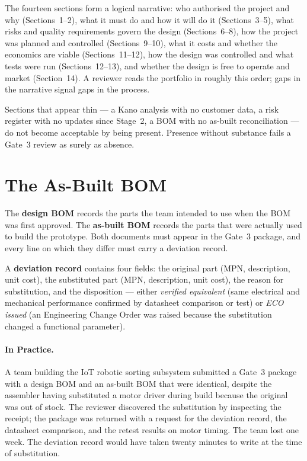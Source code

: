 The fourteen sections form a logical narrative: who authorised the project and
why (Sections~1--2), what it must do and how it will do it (Sections~3--5),
what risks and quality requirements govern the design (Sections~6--8), how the
project was planned and controlled (Sections~9--10), what it costs and whether
the economics are viable (Sections~11--12), how the design was controlled and
what tests were run (Sections~12--13), and whether the design is free to
operate and market (Section~14).
A reviewer reads the portfolio in roughly this order; gaps in the narrative
signal gaps in the process.

Sections that appear thin --- a Kano analysis with no customer data, a risk
register with no updates since Stage~2, a BOM with no as-built reconciliation
--- do not become acceptable by being present.
Presence without substance fails a Gate~3 review as surely as absence.

\section{The As-Built BOM}
\label{sec:ch16-as-built-bom}

The \textbf{design BOM} records the parts the team intended
to use when the BOM was first approved.
The \textbf{as-built BOM} records the parts that were
actually used to build the prototype.
Both documents must appear in the Gate~3 package, and every line on which they
differ must carry a deviation record.

A \textbf{deviation record} contains four fields: the
original part (MPN, description, unit cost), the substituted part (MPN,
description, unit cost), the reason for substitution, and the disposition ---
either \emph{verified equivalent} (same electrical and mechanical performance
confirmed by datasheet comparison or test) or \emph{ECO issued} (an
Engineering Change Order was raised because the substitution changed a
functional parameter).

\paragraph{In Practice.}
A team building the IoT robotic sorting subsystem submitted a Gate~3 package
with a design BOM and an as-built BOM that were identical, despite the assembler
having substituted a motor driver during build because the original was out of
stock.
The reviewer discovered the substitution by inspecting the receipt; the package
was returned with a request for the deviation record, the datasheet comparison,
and the retest results on motor timing.
The team lost one week.
The deviation record would have taken twenty minutes to write at the time of
substitution.

